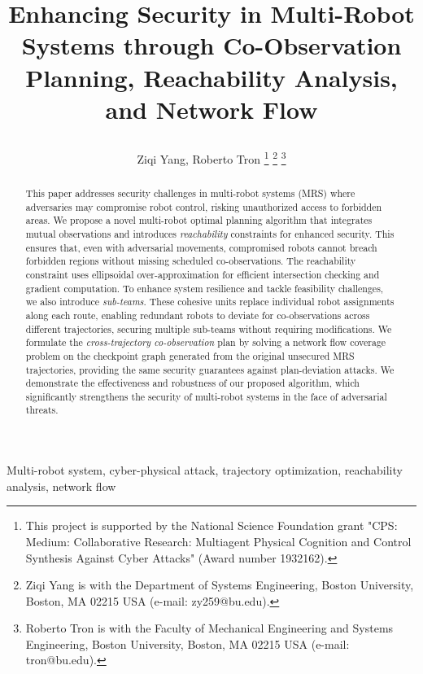 \documentclass[10pt,twocolumn,twoside]{IEEEtran}
\title{\LARGE \bf

Enhancing Security in Multi-Robot Systems through Co-Observation Planning, Reachability Analysis, and Network Flow}
\author{Ziqi Yang, Roberto Tron \IEEEmembership{Member, IEEE} 
\thanks{This project is supported by the National Science Foundation grant "CPS: Medium: Collaborative Research: Multiagent Physical Cognition and Control Synthesis Against Cyber Attacks" (Award number 1932162).}
\thanks{Ziqi Yang is with the Department of Systems Engineering,
Boston University, Boston, MA 02215 USA (e-mail: zy259@bu.edu).
}
\thanks{Roberto Tron is with the Faculty of Mechanical Engineering and Systems Engineering, Boston University, Boston, MA 02215 USA (e-mail:
tron@bu.edu).}}
\begin{document}
\maketitle
\thispagestyle{empty}
\pagestyle{empty}




\begin{abstract}
This paper addresses security challenges in multi-robot systems (MRS) where adversaries may compromise robot control, risking unauthorized access to forbidden areas. We propose a novel multi-robot optimal planning algorithm that integrates mutual observations and introduces \emph{reachability} constraints for enhanced security. This ensures that, even with adversarial movements, compromised robots cannot breach forbidden regions without missing scheduled co-observations. The reachability constraint uses ellipsoidal over-approximation for efficient intersection checking and gradient computation. To enhance system resilience and tackle feasibility challenges, we also introduce \emph{sub-teams}. These cohesive units replace individual robot assignments along each route, enabling redundant robots to deviate for co-observations across different trajectories, securing multiple sub-teams without requiring modifications. We formulate the \emph{cross-trajectory co-observation} plan by solving a network flow coverage problem on the checkpoint graph generated from the original unsecured MRS trajectories, providing the same security guarantees against plan-deviation attacks. We demonstrate the effectiveness and robustness of our proposed algorithm, which significantly strengthens the security of multi-robot systems in the face of adversarial threats.
\end{abstract}
\begin{IEEEkeywords}
  Multi-robot system, cyber-physical attack, trajectory optimization, reachability analysis, network flow
\end{IEEEkeywords}
\end{document}

